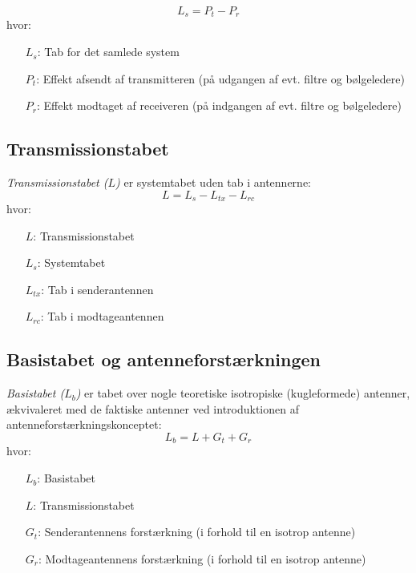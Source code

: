 \begin{equation}
L_s =P_t -P_r
\end{equation}
hvor:
\begin{itemize}[]
 \item [$L_s$:] Tab for det samlede system
 \item [$P_t$:] Effekt afsendt af transmitteren (på udgangen af evt. filtre og bølgeledere) 
 \item [$P_r$:] Effekt modtaget af receiveren (på indgangen af evt. filtre og bølgeledere)
\end{itemize}

\subsection{Transmissionstabet}
\emph{Transmissionstabet ($L$)} er systemtabet uden tab i antennerne: 
\begin{equation}
L =L_s - L_{tx} - L_{rc}
\end{equation}
hvor:
\begin{itemize}[]
 \item [$L$:] Transmissionstabet
 \item [$L_s$:] Systemtabet 
 \item [$L_{tx}$:] Tab i senderantennen
 \item [$L_{rc}$:] Tab i modtageantennen
\end{itemize}

\subsection{Basistabet og antenneforstærkningen}
\emph{Basistabet ($L_b$)} er tabet over nogle teoretiske isotropiske (kugleformede) antenner, ækvivaleret med de faktiske antenner ved introduktionen af antenneforstærkningskonceptet: 
\begin{equation}
L_b =L + G_t + G_r
\end{equation}
hvor:
\begin{itemize}[]
	\item [$L_b$:] Basistabet 
	\item [$L$:] Transmissionstabet	
	\item [$G_t$:] Senderantennens forstærkning (i forhold til en isotrop antenne)
	\item [$G_r$:] Modtageantennens forstærkning (i forhold til en isotrop antenne)
\end{itemize}

